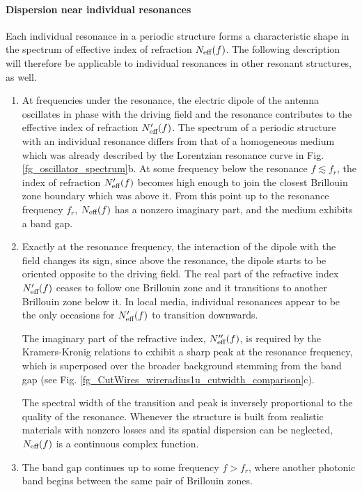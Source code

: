 \paragraph{Dispersion near individual resonances}%
Each individual resonance in a periodic structure forms a characteristic shape in the spectrum of effective index of refraction $N_{\text{eff} }(f)$. The following description will therefore be applicable to individual resonances in other resonant structures, as well. 

\begin{enumerate}
\item{At frequencies under the resonance, the electric dipole of the antenna oscillates in phase with the driving field and the resonance contributes to the effective index of refraction $N_{\text{eff} }'(f)$. 
The spectrum of a periodic structure with an individual resonance differs from that of a homogeneous medium which was already described by the Lorentzian resonance curve in Fig. \ref{fg_oscillator_spectrum}b.
At some frequency below the resonance $f \lesssim f_r$, the index of refraction $N_{\text{eff} }'(f)$ becomes high enough to join the closest Brillouin zone boundary which was above it. From this point up to the resonance frequency $f_r$, $N_{\text{eff} }(f)$ has a nonzero imaginary part, and the medium exhibits a band gap.
} 
\item{Exactly at the resonance frequency, the interaction of the dipole with the field changes its sign, since above the resonance, the dipole starts to be oriented opposite to the driving field. 
The real part of the refractive index $N_{\text{eff} }'(f)$ ceases to follow one Brillouin zone and it transitions to another Brillouin zone below it. In local media, individual resonances appear to be the only occasions for $N_{\text{eff} }'(f)$ to transition downwards.

The imaginary part of the refractive index, $N_{\text{eff} }''(f)$, is required by the Kramers-Kronig relations to exhibit a sharp peak at the resonance frequency, which is superposed over the broader background stemming from the band gap (see Fig. \ref{fg_CutWires_wireradius1u_cutwidth_comparison}c). 

The spectral width of the transition and peak is inversely proportional to the quality of the resonance. Whenever the structure is built from realistic materials with nonzero losses and its spatial dispersion can be neglected, $N_{\text{eff} }(f)$ is a continuous complex function.
} 
\item{The band gap continues up to some frequency $f > f_r$, where another photonic band begins between the same pair of Brillouin zones.  
} 
\end{enumerate}

